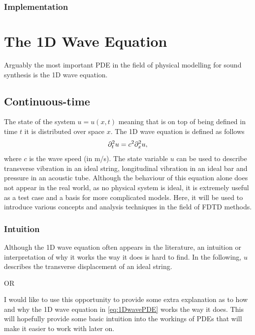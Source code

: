 \subsubsection{Implementation}


\section{%
The 1D Wave Equation}
Arguably the most important PDE in the field of physical modelling for sound synthesis is the 1D wave equation. %


\subsection{Continuous-time}
The state of the system $u=u(x,t)$ meaning that is on top of being defined in time $t$ it is distributed over space $x$. The 1D wave equation is defined as follows
\begin{equation}\label{eq:1DwavePDE}
    \partial_t^2 u = c^2 \partial_x^2 u,
\end{equation}
where $c$ is the wave speed (in m/s). The state variable $u$ can be used to describe transverse vibration in an ideal string, longitudinal vibration in an ideal bar and pressure in an acoustic tube. Although the behaviour of this equation alone does not appear in the real world, as no physical system is ideal, it is extremely useful as a test case and a basis for more complicated models. Here, it will be used to introduce various concepts and analysis techniques in the field of FDTD methods.

\subsubsection{Intuition}
Although the 1D wave equation often appears in the literature, an intuition or interpretation of why it works the way it does is hard to find. In the following, $u$ describes the transverse displacement of an ideal string.

OR 

I would like to use this opportunity to provide some extra explanation as to how and why the 1D wave equation in \eqref{eq:1DwavePDE} works the way it does. This will hopefully provide some basic intuition into the workings of PDEs that will make it easier to work with later on. \SWcomment[somethingsomething]

